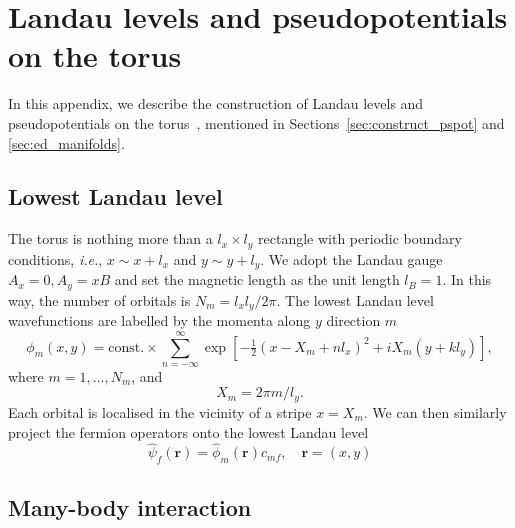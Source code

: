 \documentclass{timesjhep}
\begin{document}
\FloatBarrier

\section{Landau levels and pseudopotentials on the torus}
\label{app:manifolds}

In this appendix, we describe the construction of Landau levels and pseudopotentials on the torus~\cite{Yoshioka1983Torus,Haldane1985Torus,Haldane1987Torus}, mentioned in Sections~\ref{sec:construct_pspot} and \ref{sec:ed_manifolds}.

\subsection{Lowest Landau level}

The torus is nothing more than a $l_x\times l_y$ rectangle with periodic boundary conditions, \textit{i.e.}, $x\sim x+l_x$ and $y\sim y+l_y$. We adopt the Landau gauge $A_x=0,A_y=xB$ and set the magnetic length as the unit length $l_B=1$. In this way, the number of orbitals is $N_m=l_xl_y/2\pi$. The lowest Landau level wavefunctions are labelled by the momenta along $y$ direction $m$
\begin{equation}
    \phi_m(x,y)=\textrm{const.}\times\sum_{n=-\infty}^\infty\exp\left[-\tfrac{1}{2}(x-X_m+nl_x)^2+iX_m(y+kl_y)\right],
\end{equation}
where $m=1,\dots,N_m$, and
\begin{equation*}
    X_m=2\pi m/l_y.
\end{equation*}
Each orbital is localised in the vicinity of a stripe $x=X_m$. We can then similarly project the fermion operators onto the lowest Landau level
\begin{equation}
    \hat{\psi}_{f}(\mathbf{r})=\hat{\phi}_m(\mathbf{r})\hat{c}_{mf},\quad\mathbf{r}=(x,y)
\end{equation}

\subsection{Many-body interaction}
\end{document}
